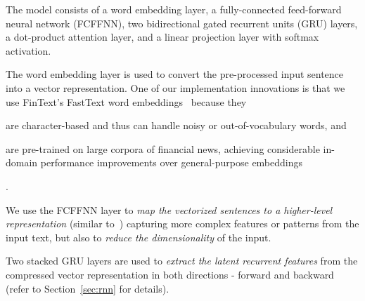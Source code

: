 \begin{minipage}[ht]{0.45\textwidth}
    The model consists of a word embedding layer, a fully-connected feed-forward neural network (FCFFNN), two bidirectional gated recurrent units (GRU) layers, a dot-product attention layer, and a linear projection layer with softmax activation.

    The word embedding layer is used to convert the pre-processed input sentence into a vector representation.
    One of our implementation innovations is that we use FinText's FastText word embeddings~\cite{rahimikia2021realised} because they
    \begin{enumerate*}[label=(\alph*)]
        \item are character-based and thus can handle noisy or out-of-vocabulary words, and
        \item are pre-trained on large corpora of financial news, achieving considerable in-domain performance improvements over general-purpose embeddings
    \end{enumerate*}.

    We use the FCFFNN layer to \emph{map the vectorized sentences to a higher-level representation} (similar to~\cite{saikh2020deep}) capturing more complex features or patterns from the input text, but also to \emph{reduce the dimensionality} of the input.

    Two stacked GRU layers are used to \emph{extract the latent recurrent features} from the compressed vector representation in both directions - forward and backward (refer to Section~\ref{sec:rnn} for details).
\end{minipage}\hfill
